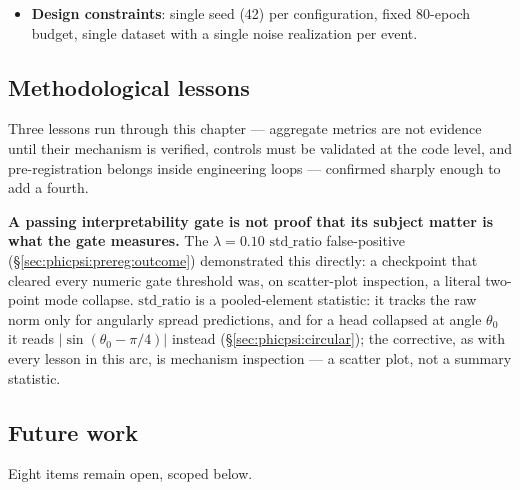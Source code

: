 \begin{itemize}
\item \textbf{Design constraints}: single seed (42) per configuration, fixed 80-epoch budget, single dataset with a single noise realization per event.
\end{itemize}

\subsection{Methodological lessons}
\label{sec:phicpsi:lessons}

Three lessons run through this chapter --- aggregate metrics are not evidence until their mechanism is verified, controls must be validated at the code level, and pre-registration belongs inside engineering loops --- confirmed sharply enough to add a fourth.

\textbf{A passing interpretability gate is not proof that its subject matter is what the gate measures.}
The $\lambda=0.10$ $\text{std\_ratio}$ false-positive (\S\ref{sec:phicpsi:prereg:outcome}) demonstrated this directly: a checkpoint that cleared every numeric gate threshold was, on scatter-plot inspection, a literal two-point mode collapse.
$\text{std\_ratio}$ is a pooled-element statistic: it tracks the raw norm only for angularly spread predictions, and for a head collapsed at angle $\theta_0$ it reads $|\sin(\theta_0-\pi/4)|$ instead (\S\ref{sec:phicpsi:circular}); the corrective, as with every lesson in this arc, is mechanism inspection --- a scatter plot, not a summary statistic.

\subsection{Future work}
\label{sec:phicpsi:future}

Eight items remain open, scoped below.

